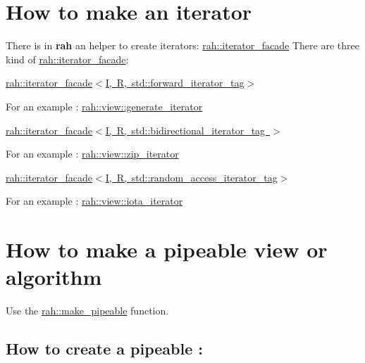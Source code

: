 \section*{How to make an iterator}

There is in {\bfseries{rah}} an helper to create iterators\+: {\ttfamily \mbox{\hyperlink{structrah_1_1iterator__facade}{rah\+::iterator\+\_\+facade}}} There are three kind of {\ttfamily \mbox{\hyperlink{structrah_1_1iterator__facade}{rah\+::iterator\+\_\+facade}}}\+:
\begin{DoxyItemize}
\item \mbox{\hyperlink{structrah_1_1iterator__facade_3_01_i_00_01_r_00_01std_1_1forward__iterator__tag_01_4}{rah\+::iterator\+\_\+facade$<$\+I, R, std\+::forward\+\_\+iterator\+\_\+tag$>$}}
\begin{DoxyItemize}
\item For an example \+: \mbox{\hyperlink{structrah_1_1view_1_1generate__iterator}{rah\+::view\+::generate\+\_\+iterator}}
\end{DoxyItemize}
\item \mbox{\hyperlink{structrah_1_1iterator__facade_3_01_i_00_01_r_00_01std_1_1bidirectional__iterator__tag_01_4}{rah\+::iterator\+\_\+facade$<$\+I, R, std\+::bidirectional\+\_\+iterator\+\_\+tag $>$}}
\begin{DoxyItemize}
\item For an example \+: \mbox{\hyperlink{structrah_1_1view_1_1zip__iterator}{rah\+::view\+::zip\+\_\+iterator}}
\end{DoxyItemize}
\item \mbox{\hyperlink{structrah_1_1iterator__facade_3_01_i_00_01_r_00_01std_1_1random__access__iterator__tag_01_4}{rah\+::iterator\+\_\+facade$<$\+I, R, std\+::random\+\_\+access\+\_\+iterator\+\_\+tag$>$}}
\begin{DoxyItemize}
\item For an example \+: \mbox{\hyperlink{structrah_1_1view_1_1iota__iterator}{rah\+::view\+::iota\+\_\+iterator}}
\end{DoxyItemize}
\end{DoxyItemize}

\section*{How to make a pipeable view or algorithm}

Use the \mbox{\hyperlink{namespacerah_a274b78c4c0af5dd58ce280f02223fb55}{rah\+::make\+\_\+pipeable}} function. \subsection*{How to create a pipeable \+:}


